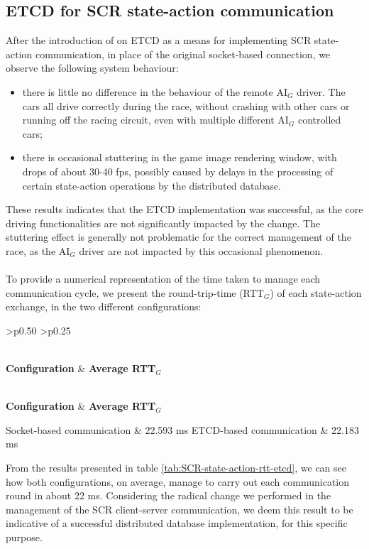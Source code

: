 \subsection{ETCD for SCR state-action communication}
After the introduction of on ETCD as a means for implementing SCR state-action communication, in place of the original socket-based connection, we observe the following system behaviour:
\begin{itemize}
	\item there is little no difference in the behaviour of the remote AI$_G$ driver. The cars all drive correctly during the race, without crashing with other cars or running off the racing circuit, even with multiple different AI$_G$ controlled cars;
	\item there is occasional stuttering in the game image rendering window, with drops of about 30-40 fps, possibly caused by delays in the processing of certain state-action operations by the distributed database.
\end{itemize}
These results indicates that the ETCD implementation was successful, as the core driving functionalities are not significantly impacted by the change. The stuttering effect is generally not problematic for the correct management of the race, as the AI$_G$ driver are not impacted by this occasional phenomenon. \\ \\
To provide a numerical representation of the time taken to manage each communication cycle, we present the round-trip-time (RTT$_G$) of each state-action exchange, in the two different configurations:

\def\arraystretch{1.75}
\begin{longtable}{ 
		>{\centering}p{} 
		>{\centering}p{}}
	
	
	\caption{SCR state-action communication RTT$_G$ - ETCD comparison.} \label{tab:SCR-state-action-rtt-etcd} \\
	\textbf{\color{white}Configuration} & 
	\centering\textbf{\color{white}Average RTT$_G$}
	\endfirsthead
	
	\caption[]{(continue)}\\
	\textbf{\color{white}Configuration} & 
	\centering\textbf{\color{white}Average RTT$_G$}
	\endhead
	
	Socket-based communication & 22.593 ms \cr
	ETCD-based communication & 22.183 ms \cr
\end{longtable}
From the results presented in table \ref{tab:SCR-state-action-rtt-etcd}, we can see how both configurations, on average, manage to carry out each communication round in about 22 ms. Considering the radical change we performed in the management of the SCR client-server communication, we deem this result to be indicative of a successful distributed database implementation, for this specific purpose.

